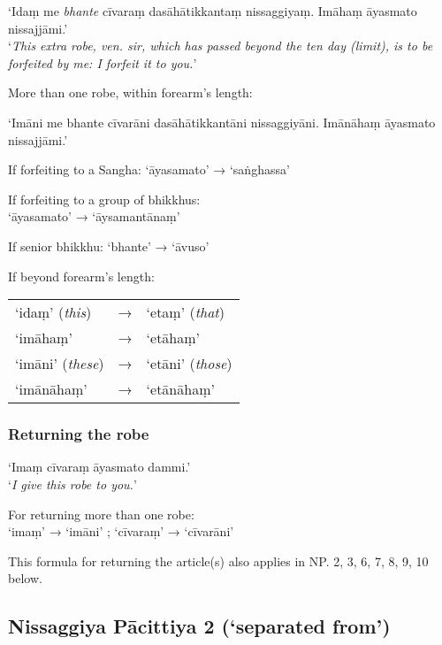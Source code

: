 ‘Idaṃ me \emph{bhante} cīvaraṃ dasāhātikkantaṃ nissaggiyaṃ. Imāhaṃ āyasmato nissajjāmi.’\\
‘\emph{This extra robe, ven. sir, which has passed beyond the ten day (limit), is
  to be forfeited by me: I forfeit it to you.}’

More than one robe, within forearm's length:

‘Imāni me bhante cīvarāni dasāhātikkantāni nissaggiyāni. Imānāhaṃ āyasmato nissajjāmi.’

If forfeiting to a Sangha: ‘āyasamato’ → ‘saṅghassa’ 

If forfeiting to a group of bhikkhus:\\
‘āyasamato’ → ‘āysamantānaṃ’

If senior bhikkhu: ‘bhante’ → ‘āvuso’

If beyond forearm's length:

\begin{tabular}{@{}lll@{}}
‘idaṃ’ (\emph{this}) & → & ‘etaṃ’ (\emph{that})\\
‘imāhaṃ’             & → & ‘etāhaṃ’\\
‘imāni’ (\emph{these}) & → & ‘etāni’ (\emph{those})\\
‘imānāhaṃ’             & → & ‘etānāhaṃ’\\
\end{tabular}

\ifhandbookedition
\vspace*{-0.5\baselineskip}

\enlargethispage{\baselineskip}
\fi

\subsubsection{Returning the robe}
\label{np-1-returning-the-robe}

‘Imaṃ cīvaraṃ āyasmato dammi.’\\
‘\emph{I give this robe to you.}’ 

For returning more than one robe:\\
‘imaṃ’ → ‘imāni’ ; ‘cīvaraṃ’ → ‘cīvarāni’

This formula for returning the article(s) also applies in NP. 2, 3, 6, 7, 8, 9,
10 below.

\subsection[NP 2 (‘separated from’)]{Nissaggiya Pācittiya 2 (‘separated from’)}

